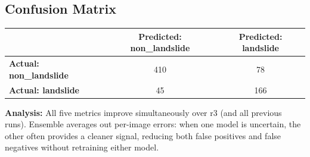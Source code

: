 \documentclass[11pt]{article}
\begin{document}
\subsection{Confusion Matrix}
\begin{table}[h]
    \centering
    \begin{tabular}{@{}lcc@{}}
        \toprule
        & \textbf{Predicted: non\_landslide} & \textbf{Predicted: landslide} \\ \midrule
        \textbf{Actual: non\_landslide} & 410 & 78 \\
        \textbf{Actual: landslide} & 45 & 166 \\ \bottomrule
    \end{tabular}
\end{table}

\textbf{Analysis:} All five metrics improve simultaneously over r3 (and all previous runs). Ensemble averages out per-image errors: when one model is uncertain, the other often provides a cleaner signal, reducing both false positives and false negatives without retraining either model.
\end{document}
